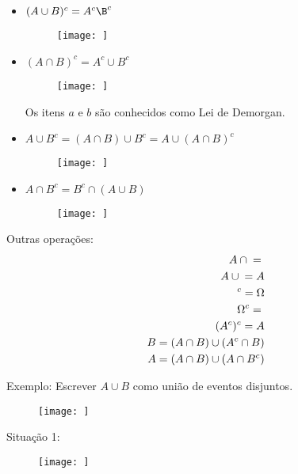 \documentclass[11pt,a4paper]{book}
\begin{document}
   \begin{itemize}
     \item $(A \cup B )^c = A^c \B^c$
       \begin{figure}[]
         \centering
         \texttt{[image: ]}
           \caption{}
           \label{figura:7}
         \end{figure}

       \item $(A \cap B)^c = A^c \cup B^c $
         \begin{figure}[]
           \centering
           \texttt{[image: ]}
             \caption{}
             \label{figura:8}
           \end{figure}

           Os itens $a$ e $b$ são conhecidos como Lei de Demorgan.
         \item $A \cup B^c = ( A \cap B ) \cup B^c = A \cup (A \cap B)^c$
           \begin{figure}[]
             \centering
             \texttt{[image: ]}
               \caption{}
               \label{figura:9}
               
             \end{figure}

             \item  $A \cap B^c = B^c \cap (A \cup B)$
               \begin{figure}[]
                 \centering
                 \texttt{[image: ]}
                   \caption{}
                   \label{figura:10}
                 \end{figure}

   \end{itemize}

   Outras operações: 
   \begin{align}
     A \cap \null = \null \\
     A \cup \null = A \\
     \null^c = \Omega \\
     \Omega^c = \null \\
     (A^c)^c = A \\
     B= (A \cap B)\cup (A^c \cap B)\\
     A= (A \cap B) \cup (A \cap B^c)
   \end{align}

   Exemplo: Escrever $A \cup B$ como união de eventos disjuntos.
   \begin{figure}[]
     \centering
     \texttt{[image: ]}
       \caption{}
       \label{figura:11}
     \end{figure}
     Situação 1:
     \begin{figure}[]
       \centering
       \texttt{[image: ]}
         \caption{}
         \label{figura:11}
       \end{figure}
\end{document}
